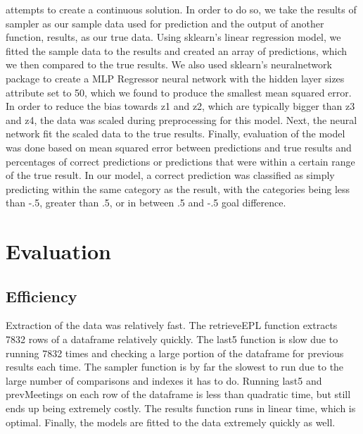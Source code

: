 \documentclass[sigconf]{acmart}
\begin{document}
attempts to create a continuous solution. In order to do so, we take the results of sampler as our sample data used for prediction and the output of another function, results, as our true data. Using sklearn's linear regression model, we fitted the sample data to the results and created an array of predictions, which we then compared to the true results. We also used sklearn's neuralnetwork package to create a MLP Regressor neural network with the hidden layer sizes attribute set to 50, which we found to produce the smallest mean squared error. In order to reduce the bias towards z1 and z2, which are typically bigger than z3 and z4, the data was scaled during preprocessing for this model. Next, the neural network fit the scaled data to the true results. Finally, evaluation of the model was done based on mean squared error between predictions and true results and percentages of correct predictions or predictions that were within a certain range of the true result. In our model, a correct prediction was classified as simply predicting within the same category as the result, with the categories being less than -.5, greater than .5, or in between .5 and -.5 goal difference.

\section{Evaluation}
\subsection{Efficiency}
Extraction of the data was relatively fast. The retrieveEPL function extracts 7832 rows of a dataframe relatively quickly. The last5 function is slow due to running 7832 times and checking a large portion of the dataframe for previous results each time. The sampler function is by far the slowest to run due to the large number of comparisons and indexes it has to do. Running last5 and prevMeetings on each row of the dataframe is less than quadratic time, but still ends up being extremely costly. The results function runs in linear time, which is optimal. Finally, the models are fitted to the data extremely quickly as well.
\end{document}
